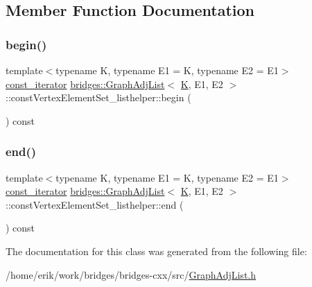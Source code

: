 \subsection{Member Function Documentation}
\mbox{\label{classbridges_1_1_graph_adj_list_1_1const_vertex_element_set__listhelper_a006c4ee341ba478ea8f22c485a2c099d}} 
\subsubsection{\texorpdfstring{begin()}{begin()}}
{\footnotesize\ttfamily template$<$typename K, typename E1 = K, typename E2 = E1$>$ \\
\hyperlink{classbridges_1_1_graph_adj_list_1_1const_vertex_element_set__listhelper_1_1const__iterator}{const\+\_\+iterator} \hyperlink{classbridges_1_1_graph_adj_list}{bridges\+::\+Graph\+Adj\+List}$<$ \hyperlink{namespacebridges_acfb0a4f7877d8f63de3e6862004c50edaa5f3c6a11b03839d46af9fb43c97c188}{K}, E1, E2 $>$\+::const\+Vertex\+Element\+Set\+\_\+listhelper\+::begin (\begin{DoxyParamCaption}{ }\end{DoxyParamCaption}) const\hspace{0.3cm}{\ttfamily [inline]}}

\mbox{\label{classbridges_1_1_graph_adj_list_1_1const_vertex_element_set__listhelper_a899b6c2765f09fd4e238cfaf869de667}} 
\subsubsection{\texorpdfstring{end()}{end()}}
{\footnotesize\ttfamily template$<$typename K, typename E1 = K, typename E2 = E1$>$ \\
\hyperlink{classbridges_1_1_graph_adj_list_1_1const_vertex_element_set__listhelper_1_1const__iterator}{const\+\_\+iterator} \hyperlink{classbridges_1_1_graph_adj_list}{bridges\+::\+Graph\+Adj\+List}$<$ \hyperlink{namespacebridges_acfb0a4f7877d8f63de3e6862004c50edaa5f3c6a11b03839d46af9fb43c97c188}{K}, E1, E2 $>$\+::const\+Vertex\+Element\+Set\+\_\+listhelper\+::end (\begin{DoxyParamCaption}{ }\end{DoxyParamCaption}) const\hspace{0.3cm}{\ttfamily [inline]}}



The documentation for this class was generated from the following file\+:\begin{DoxyCompactItemize}
\item 
/home/erik/work/bridges/bridges-\/cxx/src/\hyperlink{_graph_adj_list_8h}{Graph\+Adj\+List.\+h}\end{DoxyCompactItemize}
